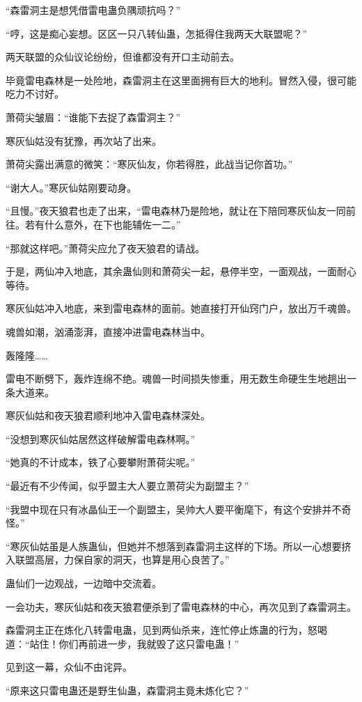 \begin{this_body}
“森雷洞主是想凭借雷电蛊负隅顽抗吗？”

“哼，这是痴心妄想。区区一只八转仙蛊，怎抵得住我两天大联盟呢？”

两天联盟的众仙议论纷纷，但谁都没有开口主动前去。

毕竟雷电森林是一处险地，森雷洞主在这里面拥有巨大的地利。冒然入侵，很可能吃力不讨好。

萧荷尖皱眉：“谁能下去捉了森雷洞主？”

寒灰仙姑没有犹豫，再次站了出来。

萧荷尖露出满意的微笑：“寒灰仙友，你若得胜，此战当记你首功。”

“谢大人。”寒灰仙姑刚要动身。

“且慢。”夜天狼君也走了出来，“雷电森林乃是险地，就让在下陪同寒灰仙友一同前往。若有什么意外，在下也能辅佐一二。”

“那就这样吧。”萧荷尖应允了夜天狼君的请战。

于是，两仙冲入地底，其余蛊仙则和萧荷尖一起，悬停半空，一面观战，一面耐心等待。

寒灰仙姑冲入地底，来到雷电森林的面前。她直接打开仙窍门户，放出万千魂兽。

魂兽如潮，汹涌澎湃，直接冲进雷电森林当中。

轰隆隆……

雷电不断劈下，轰炸连绵不绝。魂兽一时间损失惨重，用无数生命硬生生地趟出一条大道来。

寒灰仙姑和夜天狼君顺利地冲入雷电森林深处。

“没想到寒灰仙姑居然这样破解雷电森林啊。”

“她真的不计成本，铁了心要攀附萧荷尖呢。”

“最近有不少传闻，似乎盟主大人要立萧荷尖为副盟主？”

“我盟中现在只有冰晶仙王一个副盟主，吴帅大人要平衡麾下，有这个安排并不奇怪。”

“寒灰仙姑虽是人族蛊仙，但她并不想落到森雷洞主这样的下场。所以一心想要挤入联盟高层，力保自家的洞天，也算是用心良苦了。”

蛊仙们一边观战，一边暗中交流着。

一会功夫，寒灰仙姑和夜天狼君便杀到了雷电森林的中心，再次见到了森雷洞主。

森雷洞主正在炼化八转雷电蛊，见到两仙杀来，连忙停止炼蛊的行为，怒喝道：“站住！你们再前进一步，我就毁了这只雷电蛊！”

见到这一幕，众仙不由诧异。

“原来这只雷电蛊还是野生仙蛊，森雷洞主竟未炼化它？”


\end{this_body}
